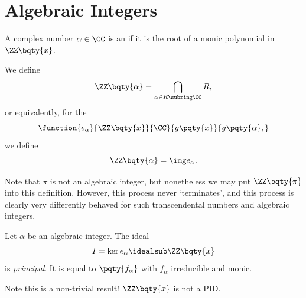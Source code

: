 \section{Algebraic Integers}

\begin{definition}
    \label{def:algebraic-integer}%
    A complex number \(\alpha \in \CC\) is an  if it is the root of a monic polynomial in \(\ZZ\bqty{x}\).

    We define
    \[
        \ZZ\bqty{\alpha} = \bigcap_{\alpha \in R \subring \CC} R,
    \]
    or equivalently, for the 
    \[
        \function{e_\alpha}{\ZZ\bqty{x}}{\CC}{g\pqty{x}}{g\pqty{\alpha},}
    \]
    we define
    \[
        \ZZ\bqty{\alpha} = \img e_{\alpha}.
    \]
\end{definition}

Note that \(\pi\) is not an algebraic integer, but nonetheless we may put \(\ZZ\bqty{\pi}\) into this definition. However, this process never `terminates', and this process is clearly very differently behaved for such transcendental numbers and algebraic integers.

\begin{proposition}
    \label{prop:ideal-polynomial-algebraic-integer-principal}%
    Let \(\alpha\) be an algebraic integer. The ideal
    \[
        I = \ker e_{\alpha} \idealsub \ZZ\bqty{x}
    \]
    is \emph{principal}. It is equal to \(\pqty{f_\alpha}\) with \(f_\alpha\) irreducible and monic.
\end{proposition}

Note this is a non-trivial result! \(\ZZ\bqty{x}\) is not a PID.

